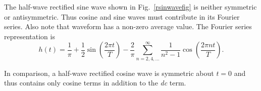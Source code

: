 \documentclass{revtex4}
\begin{document}
The half-wave rectified sine wave shown in Fig.~\ref{rsinwavefig}
is neither symmetric or antisymmetric.  Thus cosine and sine waves
must contribute in its Fourier series.  Also note that waveform has a
non-zero average value. The Fourier series representation is
\begin{equation}
h(t) = \frac{1}{\pi}+\frac{1}{2}\sin\left(\frac{2\pi t}{T}\right)
-\frac{2}{\pi}\sum_{n=2,4,\ldots}^{\infty}\frac{1}{n^2-1}
\cos\left(\frac{2\pi nt}{T}\right).
\label{eq:rsinwave}
\end{equation}

In comparison, a half-wave rectified cosine wave is symmetric about
$t = 0$ and thus contains only cosine terms in addition to the
{\em dc} term.
\end{document}
